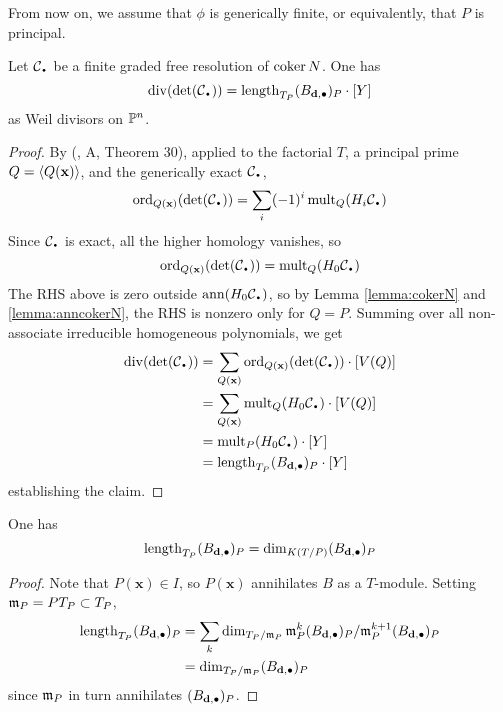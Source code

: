 \documentclass[fleqn,reqno]{amsart}
\begin{document}
\begin{paragraf*}
From now on, we assume that $\phi$ is generically finite, or equivalently,
that $P$ is principal.
\end{paragraf*}

\begin{lemma}
\label{lemma:divdetC}
Let $\mathcal{C}_\nbul$ be a finite graded free resolution of $\operatorname{coker} N$. One has
\[
	\thediv(\det(\mathcal{C}_\nbul))=\length_{T_P}(B_{\d,\bullet})_P\cdot[Y]
\]
as Weil divisors on $\mathbb{P}^n$.
\end{lemma}

\begin{proof}
By (\citet{GKZ94}, A, Theorem 30), applied to the factorial $T$, a principal prime $Q=\langle Q(\mathbf x)\rangle$,
and the generically exact $\mathcal{C}_\nbul$,
\[
	\ord_{Q(\mathbf x)}(\det(\mathcal{C}_\nbul))=\sum_i (-1)^i \mult_Q(H_i\mathcal{C}_\nbul)
\]
Since $\mathcal{C}_\nbul$ is exact, all the higher homology vanishes, so
\[
	\ord_{Q(\mathbf x)}(\det(\mathcal{C}_\nbul))=\mult_Q(H_0\mathcal{C}_\nbul)
\]
The RHS above is zero outside $\ann(H_0\mathcal{C}_\nbul)$,
so by Lemma \ref{lemma:cokerN} and \ref{lemma:anncokerN},
the RHS is nonzero only for $Q=P$.
Summing over all non-associate irreducible homogeneous polynomials,
we get
\begin{align*}
	\thediv(\det(\mathcal{C}_\nbul))&=\sum_{Q(\mathbf x)}
		\ord_{Q(\mathbf x)}(\det(\mathcal{C}_\nbul))\cdot[V(Q)]\\
	&=\sum_{Q(\mathbf x)} \mult_Q (H_0\mathcal{C}_\nbul)\cdot [V(Q)]\\
	&=\mult_P (H_0\mathcal{C}_\nbul)\cdot[Y]\\
	&=\length_{T_P}(B_{\d,\bullet})_P\cdot[Y]
\end{align*}
establishing the claim.
\end{proof}

\begin{lemma}
\label{lemma:lengthBdimB}
One has
\[
	\operatorname{length}_{T_P}(B_{\mathbf d,\bullet})_P=\dim_{K(T/P)}(B_{\mathbf d,\bullet})_P
\]
\end{lemma}

\begin{proof}
Note that $P(\mathbf x)\in I$, so $P(\mathbf x)$ annihilates $B$ as a $T$-module.
Setting $\mathfrak{m}_P=PT_P\subset T_P$,
\begin{align*}
	\operatorname{length}_{T_P}(B_{\mathbf d,\bullet})_P&=
	\sum_{k}\dim_{T_P/\mathfrak{m}_P} \mathfrak{m}_P^{k}(B_{\mathbf d,\bullet})_P/\mathfrak{m}_P^{k+1}(B_{\mathbf d,\bullet})_P\\
	&=\dim_{T_P/\mathfrak{m}_P}(B_{\mathbf d,\bullet})_P
\end{align*}
since $\mathfrak{m}_P$ in turn annihilates $(B_{\mathbf d,\bullet})_P$.
\end{proof}
\end{document}
